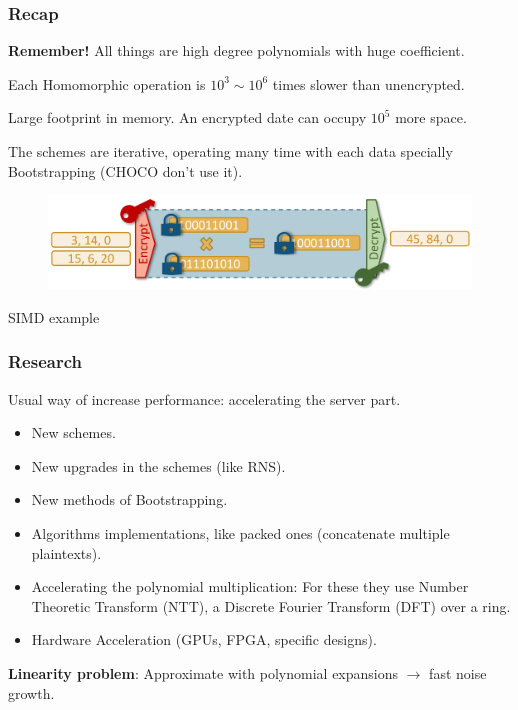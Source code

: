 \documentclass[10pt]{beamer}
\begin{document}

\begin{frame}
\frametitle{Recap}

    \textbf{Remember!} All things are high degree polynomials with huge coefficient.


Each Homomorphic operation is $10^3 \sim 10^6$ times slower than unencrypted.
\pause

Large footprint in memory.
An encrypted date can occupy $10^5$ more space.

\pause
    The schemes are iterative, operating many time with each data specially Bootstrapping (CHOCO don't use it).

        \begin{figure}[h!]
            \centering
            \includegraphics[scale=0.8]{workflow.png}
        \end{figure}
    \centering
        SIMD example


\end{frame}


\begin{frame}
\frametitle{Research}

    Usual way of increase performance:  accelerating the server part.
\pause
\begin{itemize}\itemsep-0.7em
   \item New schemes.
   \item New upgrades in the schemes (like RNS).
   \item New methods of Bootstrapping.
\pause
   \item Algorithms implementations, like packed ones (concatenate multiple plaintexts).
   \item Accelerating the polynomial multiplication:
       For these they use Number Theoretic Transform (NTT), a Discrete Fourier Transform (DFT) over a ring.
   \item Hardware Acceleration (GPUs, FPGA, specific designs).
\end{itemize}
\pause

    \textbf{Linearity problem}: Approximate with polynomial expansions $\rightarrow$ fast noise growth.
\end{frame}
\end{document}
